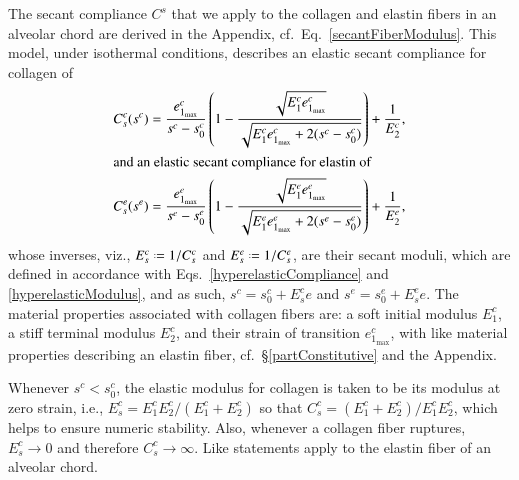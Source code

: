 The secant compliance $C^s$ that we apply to the collagen and elastin fibers in an alveolar chord are derived in the Appendix, cf.\ Eq.~\ref{secantFiberModulus}.  This model, under isothermal conditions, describes an elastic secant compliance for collagen of
\begin{subequations}
    \label{fiberCompliance}
    \begin{align}
    C_s^c (s^c) & = \frac{e^c_{1_{\max}}}{s^c - s^c_0} \left( 
    1 - \frac{\sqrt{E^c_1 e^c_{1_{\max}}}}{\sqrt{E^c_1 e^c_{1_{\max}} + 
            2 (s^c - s^c_0)}} \right) + \frac{1}{E^c_2} ,\\
    \intertext{and an elastic secant compliance for elastin of}
    C_s^e (s^e) & = \frac{e^e_{1_{\max}}}{s^e - s^e_0} \left( 
    1 - \frac{\sqrt{E^e_1 e^e_{1_{\max}}}}{\sqrt{E^e_1 e^e_{1_{\max}} + 
            2 (s^e - s^e_0)}} \right) + \frac{1}{E^e_2} ,
    \end{align}
\end{subequations}
whose inverses, viz., $E^c_s \defeq 1 / C^c_s$ and $E^e_s \defeq 1 / C^e_s$, are their secant moduli, which are defined in accordance with Eqs.~\ref{hyperelasticCompliance} and \ref{hyperelasticModulus}, and as such, $s^c = s_0^c + E^c_s e$ and $s^e = s_0^e + E^e_s e$.  The material properties associated with collagen fibers are: a soft initial modulus $E^c_1$, a stiff terminal modulus $E^c_2$, and their strain of transition $e^c_{1_{\max}}$, with like material properties describing an elastin fiber, cf.\ \S\ref{partConstitutive} and the Appendix.

Whenever $s^c < s^c_0$, the elastic modulus for collagen is taken to be its modulus at zero strain, i.e., $E^c_s = E^c_1 E^c_2 / ( E^c_1 + E^c_2 )$ so that $C^c_s = (E^c_1 + E^c_2) / E^c_1 E^c_2$, which helps to ensure numeric stability.  Also, whenever a collagen fiber ruptures, $E^c_s \to 0$ and therefore $C^c_s \to \infty$.  Like statements apply to the elastin fiber of an alveolar chord.

